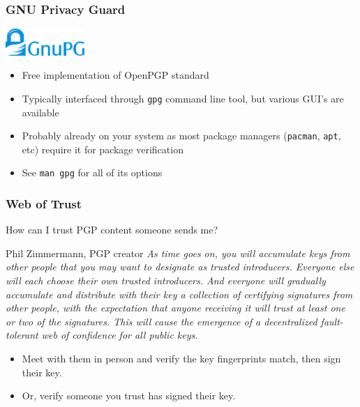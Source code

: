 \documentclass{beamer}
\begin{document}
\begin{frame}
    \frametitle{GNU Privacy Guard}
    \includegraphics[width=3cm]{graphics/Gnupg_logo.pdf}
    \begin{itemize}[<+->]
        \item Free implementation of OpenPGP standard
        \item Typically interfaced through \texttt{gpg} command line tool, but
            various GUI's are available
        \item Probably already on your system as most package managers
            (\texttt{pacman}, \texttt{apt}, etc) require it for package
            verification
        \item See \texttt{man gpg} for all of its options
    \end{itemize}
\end{frame}

\begin{frame}
    \frametitle{Web of Trust}
    How can I trust PGP content someone sends me?
    \pause
    \begin{block}{Phil Zimmermann, PGP creator}
        \small \itshape
        As time goes on, you will accumulate keys from other people that you
        may want to designate as trusted introducers. Everyone else will each
        choose their own trusted introducers. And everyone will gradually
        accumulate and distribute with their key a collection of certifying
        signatures from other people, with the expectation that anyone
        receiving it will trust at least one or two of the signatures. This
        will cause the emergence of a decentralized fault-tolerant web of
        confidence for all public keys.
    \end{block}
    \pause
    \begin{itemize}[<+->]
        \item Meet with them in person and verify the key fingerprints match,
            then sign their key.
        \item Or, verify someone you trust has signed their key.
    \end{itemize}
\end{frame}
\end{document}
